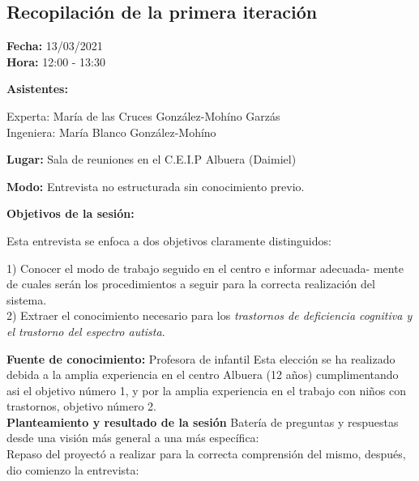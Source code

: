 \documentclass[letterpaper,12pt]{article}
\begin{document}
	\subsection{Recopilación de la primera iteración}
	\begin{flushleft}
	\textbf{Fecha: }13/03/2021 \\
	\textbf{Hora: }12:00 - 13:30 \\
	
	\end{flushleft} 
	\begin{flushleft}
	\textbf{Asistentes: } \\
	\end{flushleft}
	Experta: María de las Cruces González-Mohíno Garzás\\
	Ingeniera: María Blanco González-Mohíno
	
	\begin{flushleft}
	\textbf{Lugar:} Sala de reuniones en el C.E.I.P Albuera (Daimiel)
	\end{flushleft}
	\begin{flushleft}
	\textbf{Modo:} Entrevista no estructurada sin conocimiento previo.
	\end{flushleft}
	\begin{flushleft}
	\textbf{Objetivos de la sesión:}
	\end{flushleft}
	Esta entrevista se enfoca a dos objetivos claramente distinguidos: \\
	
	\begin{flushleft}
	1) Conocer el modo de trabajo seguido en el centro e informar adecuada-
mente de cuales serán los procedimientos a seguir para la correcta realización
del sistema. \\
	2) Extraer el conocimiento necesario para los \textit{trastornos de deficiencia
cognitiva y el trastorno del espectro autista}.
	\end{flushleft}
	
	\textbf{Fuente de conocimiento: }Profesora de infantil	
	Esta elección se ha realizado debida a la amplia experiencia en el centro Albuera (12 años) cumplimentando asi el objetivo número 1, y por la amplia
experiencia en el trabajo con niños con trastornos, objetivo número 2. \\

\textbf{Planteamiento y resultado de la sesión}
Batería de preguntas y respuestas desde una visión más general a una más
específica: \\
Repaso del proyectó a realizar para la correcta comprensión del mismo,
después, dio comienzo la entrevista: \\
	
\end{document}
